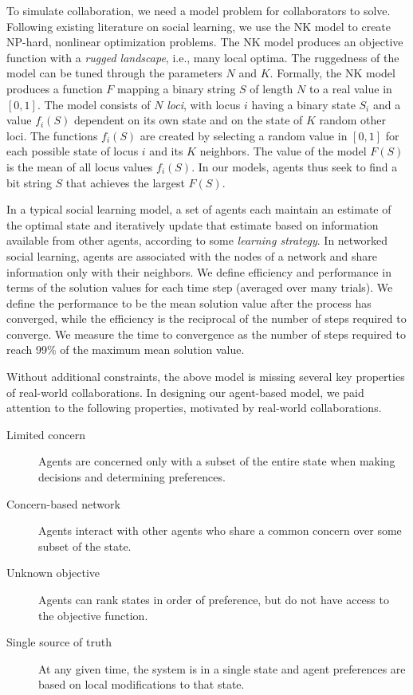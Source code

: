 To simulate collaboration, we need a model problem for collaborators to solve.
Following existing literature on social learning,
we use the NK model \cite{kauffman_towards_1987}
to create NP-hard, nonlinear optimization problems.
The NK model produces an objective function with a
{\em rugged landscape}, i.e., many local optima.
The ruggedness of the model can be tuned through the parameters $N$ and $K$.
Formally, the NK model produces a function $F$ mapping a binary string $S$ of length
$N$ to a real value in $[0,1]$.
The model consists of $N$ {\em loci}, with locus $i$ having a binary state $S_i$
and a value $f_i(S)$ dependent on its own state
and on the state of $K$ random other loci.
The functions $f_i(S)$ are created by selecting a random value in $[0,1]$ for
each possible state of locus $i$ and its $K$ neighbors.
The value of the model $F(S)$ is the mean of all locus values $f_i(S)$.
In our models,
agents thus seek to find a bit string $S$ that achieves the largest $F(S)$.

In a typical social learning model,
a set of agents each maintain an estimate of the optimal state
and iteratively update that estimate based on information available from other agents,
according to some {\em learning strategy}.
In networked social learning,
agents are associated with the nodes of a network and share information
only with their neighbors.
We define efficiency and performance in terms of the solution values for each time step
(averaged over many trials).
We define the performance to be the mean solution value after the process has converged,
while the efficiency is the reciprocal of the number of steps required to converge.
We measure the time to convergence as the number of steps required to reach 99\% of the maximum
mean solution value.

Without additional constraints,
the above model is missing
several key properties of real-world collaborations.
In designing our agent-based model, we paid attention to the
following properties, motivated by real-world collaborations.
\begin{description}
\item[Limited concern] Agents are concerned only with a subset of the entire
state when making decisions and determining preferences.
\item[Concern-based network] Agents interact with other agents who share a
common concern over some subset of the state.
\item[Unknown objective] Agents can rank states in order of preference,
but do not have access to the objective function.
\item[Single source of truth] At any given time, the system is in a single state
and agent preferences are based on local modifications to that state.
\end{description}

